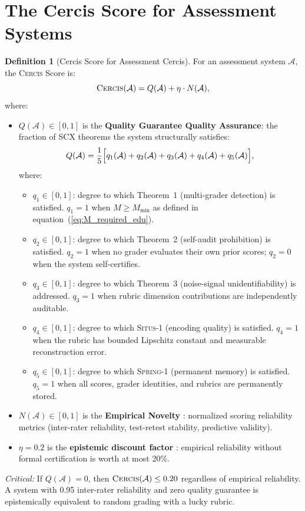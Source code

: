\documentclass[11pt,a4paper]{article}
\theoremstyle{definition}
\newtheorem{definition}[theorem]{Definition}
\theoremstyle{remark}
\newcommand{\SCX}{\textsc{SCX}}
\newcommand{\Situs}{\textsc{Situs}}
\newcommand{\Cercis}{\textsc{Cercis}}
\newcommand{\Spring}{\textsc{Spring}}
\newcommand{\cA}{\mathcal{A}}
\begin{document}
\section{The Cercis Score for Assessment Systems}
\label{sec:cercis}
\begin{definition}[Cercis Score for Assessment Cercis]
\label{def:cercis_edu}
For an assessment system $\cA$, the \Cercis{} Score is:
\begin{equation}
    \Cercis(\cA) = Q(\cA) + \eta \cdot N(\cA),
\end{equation}
where:
\begin{itemize}[nosep]
    \item $Q(\cA) \in [0,1]$ is the \textbf{Quality Guarantee Quality Assurance}: the fraction of \SCX{} theorems the system structurally satisfies:
    \begin{equation}
        Q(\cA) = \frac{1}{5}\Bigl[q_1(\cA) + q_2(\cA) + q_3(\cA) + q_4(\cA) + q_5(\cA)\Bigr],
    \end{equation}
    where:
    \begin{itemize}[nosep]
        \item $q_1 \in [0,1]$: degree to which Theorem~1 (multi-grader detection) is satisfied. $q_1 = 1$ when $M \ge M_{\min}$ as defined in equation~(\ref{eq:M_required_edu}).
        \item $q_2 \in [0,1]$: degree to which Theorem~2 (self-audit prohibition) is satisfied. $q_2 = 1$ when no grader evaluates their own prior scores; $q_2 = 0$ when the system self-certifies.
        \item $q_3 \in [0,1]$: degree to which Theorem~3 (noise-signal unidentifiability) is addressed. $q_3 = 1$ when rubric dimension contributions are independently auditable.
        \item $q_4 \in [0,1]$: degree to which \Situs{}-1 (encoding quality) is satisfied. $q_4 = 1$ when the rubric has bounded Lipschitz constant and measurable reconstruction error.
        \item $q_5 \in [0,1]$: degree to which \Spring{}-1 (permanent memory) is satisfied. $q_5 = 1$ when all scores, grader identities, and rubrics are permanently stored.
    \end{itemize}
    \item $N(\cA) \in [0,1]$ is the \textbf{Empirical Novelty }: normalized scoring reliability metrics (inter-rater reliability, test-retest stability, predictive validity).
    \item $\eta = 0.2$ is the \textbf{epistemic discount factor }: empirical reliability without formal certification is worth at most 20\%.
\end{itemize}
\textit{Critical:} If $Q(\cA) = 0$, then $\Cercis(\cA) \le 0.20$ regardless of empirical reliability. A system with 0.95 inter-rater reliability and zero quality guarantee is epistemically equivalent to random grading with a lucky rubric.
\end{definition}
\end{document}
